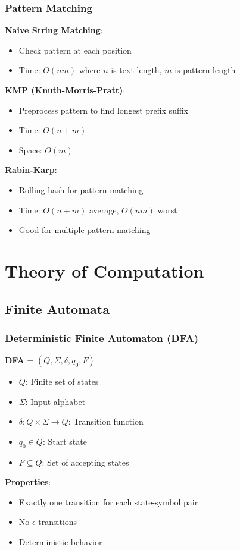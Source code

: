 \documentclass[12pt,a4paper]{report}
\begin{document}
\subsection{Pattern Matching}
\begin{concept}
\textbf{Naive String Matching}:
\begin{itemize}
    \item Check pattern at each position
    \item Time: $O(nm)$ where $n$ is text length, $m$ is pattern length
\end{itemize}

\textbf{KMP (Knuth-Morris-Pratt)}:
\begin{itemize}
    \item Preprocess pattern to find longest prefix suffix
    \item Time: $O(n + m)$
    \item Space: $O(m)$
\end{itemize}

\textbf{Rabin-Karp}:
\begin{itemize}
    \item Rolling hash for pattern matching
    \item Time: $O(n + m)$ average, $O(nm)$ worst
    \item Good for multiple pattern matching
\end{itemize}
\end{concept}

\chapter{Theory of Computation}

\section{Finite Automata}

\subsection{Deterministic Finite Automaton (DFA)}
\begin{concept}
\textbf{DFA} = $(Q, \Sigma, \delta, q_0, F)$
\begin{itemize}
    \item $Q$: Finite set of states
    \item $\Sigma$: Input alphabet
    \item $\delta: Q \times \Sigma \to Q$: Transition function
    \item $q_0 \in Q$: Start state
    \item $F \subseteq Q$: Set of accepting states
\end{itemize}

\textbf{Properties}:
\begin{itemize}
    \item Exactly one transition for each state-symbol pair
    \item No $\epsilon$-transitions
    \item Deterministic behavior
\end{itemize}
\end{concept}
\end{document}

